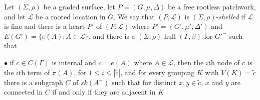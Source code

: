 Let $(\Sigma, \rho)$ be a graded surface, let $P = (G, \mu, \Delta)$ be a free rootless patchwork, and let $\mathcal{L}$ be a rooted location in $G$. We say that $(P, \mathcal{L})$ is $(\Sigma, \rho)$-\textit{shelled} if $\mathcal{L}$ is fine and there is a heart $P'$ of $(P, \mathcal{L})$ where $P' = (G', \mu', \Delta')$ and $E(G') = \{e(A) : A \in \mathcal{L}\}$, and there is a $(\Sigma, \rho)$-hull $(\Gamma, \beta)$ for $G'^-$ such that

\hspace*{12pt}$\bullet$ if $c \in C(\Gamma)$ is internal and $c = e(A)$ where $A \in \mathcal{L}$, then the $i$th node of $c$ is the $i$th term of $\pi(A)$, for $1 \le i \le |\tilde{c}|$, and for every grouping $K$ with $V(K) = \tilde{c}$ there is a subgraph $C$ of $sk(A^-)$ such that for distinct $x, y \in \tilde{c}$, $x$ and $y$ are connected in $C$ if and only if they are adjacent in $K$
